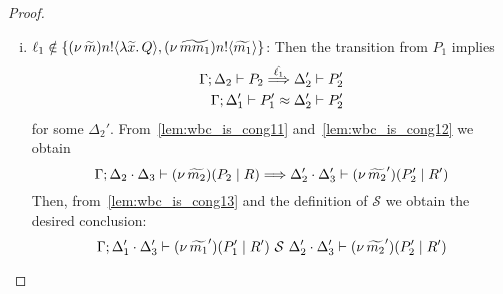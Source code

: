 \begin{proof}
\begin{enumerate}[I.]
\begin{enumerate}[1.]
\begin{enumerate}[i.]
				\item	$\ell_1 \notin \{(\nu\, \widetilde{m}) n ! \langle \lambda \widetilde{x}.\,Q \rangle, (\nu\, \widetilde{mm_1}) n ! \langle \widetilde{m_1} \rangle\}$: Then the transition from $P_1$
						implies
						\begin{eqnarray}
							\Gamma; \Delta_2 \vdash P_2 \stackrel{\hat{\ell_1}}{\Longrightarrow} \Delta_2' \vdash P_2'
							\label{lem:wbc_is_cong12}\\
							\Gamma; \Delta_1' \vdash P_1' \approx \Delta_2' \vdash P_2'
							\label{lem:wbc_is_cong13}
						\end{eqnarray}
for some $\Delta_2'$. From~\eqref{lem:wbc_is_cong11} and~\eqref{lem:wbc_is_cong12} we obtain
						\[
							\Gamma; \Delta_2 \cdot \Delta_3 \vdash (\nu\, \widetilde{m_2})(P_2 \;|\; R) \stackrel{}{\Longrightarrow} \Delta_2' \cdot \Delta_3' \vdash (\nu\, \widetilde{m_2}')(P_2' \;|\; R')
						\]
						Then, from~\eqref{lem:wbc_is_cong13} and the definition of  $\mathcal{S}$  we obtain the desired conclusion:
						\[
							\Gamma; \Delta_1' \cdot \Delta_3' \vdash (\nu\, \widetilde{m_1}')(P_1' \;|\; R') \ \mathcal{S}\  \Delta_2' \cdot \Delta'_3 \vdash (\nu\, \widetilde{m_2}')(P_2' \;|\; R')
						\]


\end{enumerate}
\end{enumerate}
\end{enumerate}
\end{proof}
